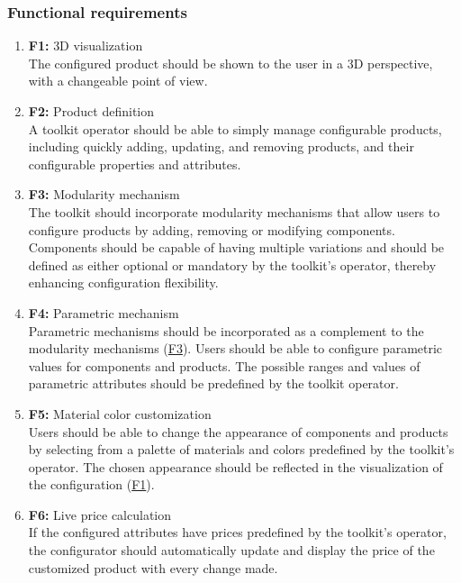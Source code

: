 \subsubsection{Functional requirements}

\begin{enumerate}
\item \textbf{F1:} \label{itm:F1} 3D visualization
\\The configured product should be shown to the user in a 3D perspective, with a changeable point of view. 

\item \textbf{F2:} Product definition
\\A toolkit operator should be able to simply manage configurable products, including quickly adding, updating, and removing products, and their configurable properties and attributes.

\item \textbf{F3:} \label{itm:F3} Modularity mechanism
\\The toolkit should incorporate modularity mechanisms that allow users to configure products by adding, removing or modifying components. Components should be capable of having multiple variations and should be defined as either optional or mandatory by the toolkit's operator, thereby enhancing configuration flexibility.

\item \textbf{F4:} Parametric mechanism
\\Parametric mechanisms should be incorporated as a complement to the modularity mechanisms (\hyperref[itm:F3]{F3}). Users should be able to configure parametric values for components and products. The possible ranges and values of parametric attributes should be predefined by the toolkit operator.

\item \textbf{F5:} Material color customization
\\Users should be able to change the appearance of components and products by selecting from a palette of materials and colors predefined by the toolkit's operator. The chosen appearance should be reflected in the visualization of the configuration (\hyperref[itm:F1]{F1}).

\item \textbf{F6:} Live price calculation
\\If the configured attributes have prices predefined by the toolkit's operator, the configurator should automatically update and display the price of the customized product with every change made.


\end{enumerate}
